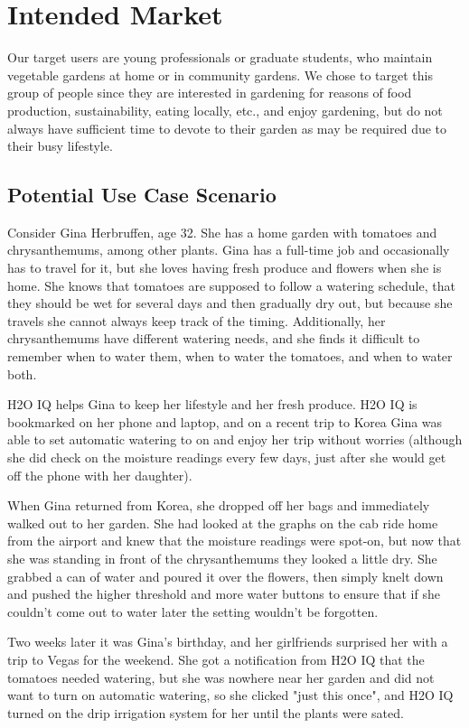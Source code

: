 \documentclass[11pt]{article}
\begin{document}
\section{Intended Market}

Our target users are young professionals or graduate students, who maintain vegetable gardens at home or in community gardens. We chose to target this group of people since they are interested in gardening for reasons of food production, sustainability, eating locally, etc., and enjoy gardening, but do not always have sufficient time to devote to their garden as may be required due to their busy lifestyle.

\subsection{Potential Use Case Scenario}
Consider Gina Herbruffen, age 32.  She has a home garden with tomatoes and chrysanthemums, among other plants.  Gina has a full-time job and occasionally has to travel for it, but she loves having fresh produce and flowers when she is home.  She knows that tomatoes are supposed to follow a watering schedule, that they should be wet for several days and then gradually dry out, but because she travels she cannot always keep track of the timing.  Additionally, her chrysanthemums have different watering needs, and she finds it difficult to remember when to water them, when to water the tomatoes, and when to water both.

H2O IQ helps Gina to keep her lifestyle and her fresh produce.  H2O IQ is bookmarked on her phone and laptop, and on a recent trip to Korea Gina was able to set automatic watering to on and enjoy her trip without worries (although she did check on the moisture readings every few days, just after she would get off the phone with her daughter).

When Gina returned from Korea, she dropped off her bags and immediately walked out to her garden.  She had looked at the graphs on the cab ride home from the airport and knew that the moisture readings were spot-on, but now that she was standing in front of the chrysanthemums they looked a little dry.  She grabbed a can of water and poured it over the flowers, then simply knelt down and pushed the higher threshold and more water buttons to ensure that if she couldn't come out to water later the setting wouldn't be forgotten.

Two weeks later it was Gina's birthday, and her girlfriends surprised her with a trip to Vegas for the weekend.  She got a notification from H2O IQ that the tomatoes needed watering, but she was nowhere near her garden and did not want to turn on automatic watering, so she clicked "just this once", and H2O IQ turned on the drip irrigation system for her until the plants were sated.
\end{document}
